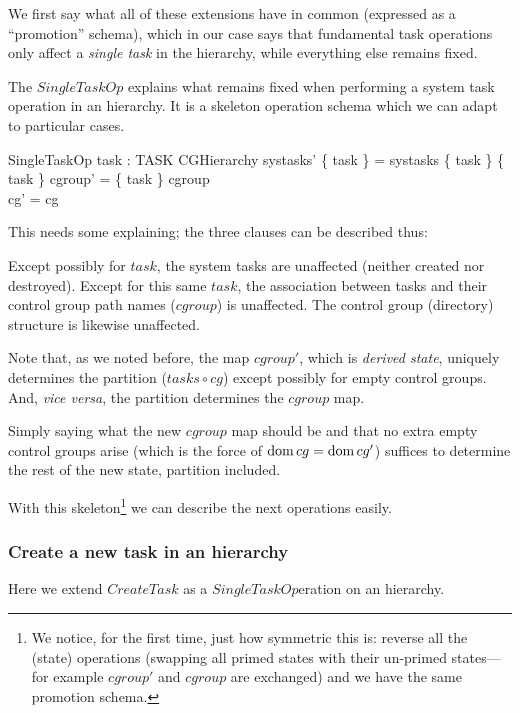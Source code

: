 \documentclass[a4paper,twoside,12pt]{article}
\begin{document}
We first say what all of these extensions have in common (expressed as a ``promotion'' schema), 
which in our case says that fundamental task operations only affect a \emph{single task} in the hierarchy, while 
everything else remains fixed.

The $SingleTaskOp$ explains what remains fixed when performing a system task operation in an hierarchy. 
It is a skeleton operation schema which we can adapt to particular cases.

\begin{schema}{SingleTaskOp}
task : TASK
\also
\Delta CGHierarchy
\where
systasks' \setminus \{ task \} = systasks \setminus \{ task \}
\also
\{ task \} \ndres cgroup' = \{ task \} \ndres cgroup \\
\dom cg' = \dom cg
\end{schema}
This needs some explaining; the three clauses can be described thus:

Except possibly for $task$, the system tasks are unaffected (neither created nor destroyed).
Except for this same $task$, the association between tasks and their control group path names ($cgroup$) is unaffected.
The control group (directory) structure is likewise unaffected.

Note that, as we noted before, the map $cgroup'$, which is \emph{derived state}, 
uniquely determines the partition ($tasks \circ cg$) except possibly for
empty control groups. And, \emph{vice versa}, the partition determines the $cgroup$ map. 

Simply saying what the new $cgroup$ map should be and that no extra empty control groups arise 
(which is the force of $\mathop{\mathrm{dom}} cg = \mathop{\mathrm{dom}} cg'$) 
suffices to determine the rest of the new state, partition included.

With this skeleton\footnote{We notice, for the first time, just how symmetric this is: 
reverse all the (state) operations (swapping all primed states with their un-primed states---for 
example $cgroup'$ and $cgroup$ are exchanged) and we have the same promotion schema.}
we can describe the next operations easily.

\subsubsection{Create a new task in an hierarchy}

Here we extend $CreateTask$ as a $SingleTaskOp$eration on an hierarchy.
\end{document}
